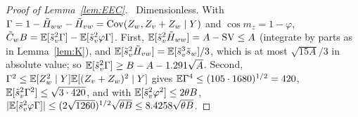 \begin{proof}[Proof of Lemma~\ref{lem:EEC}]\proofst\
Dimensionless. With $\Gamma=1-\tilde H_{ww}-\tilde H_{vw}=\operatorname{Cov}(Z_w,Z_v+Z_w\mid Y)$ and $\cos m_z=1-\varphi$, $\tilde C_wB=\mathbb{E}[\tilde s_v^2\Gamma]-\mathbb{E}[\tilde s_v^2\varphi\Gamma]$.
First, $\mathbb{E}[\tilde s_v^2\tilde H_{ww}]=A-\mathrm{SV}\le A$ (integrate by parts as in Lemma~\ref{lem:K}), and $\mathbb{E}[\tilde s_v^2\tilde H_{vw}]=\mathbb{E}[\tilde s_v^3\tilde s_w]/3$, which is at most $\sqrt{15A}/3$ in absolute value; so $\mathbb{E}[\tilde s_v^2\Gamma]\ge B-A-1.291\sqrt A$.
Second, $\Gamma^2\le\mathbb{E}[Z_w^2\mid Y]\mathbb{E}[(Z_v+Z_w)^2\mid Y]$ gives $\mathbb{E}\Gamma^4\le(105\cdot1680)^{1/2}=420$, $\mathbb{E}[\tilde s_v^2\Gamma^2]\le\sqrt{3\cdot420}$, and with $\mathbb{E}[\tilde s_v^2\varphi^2]\le2\theta B$, $|\mathbb{E}[\tilde s_v^2\varphi\Gamma]|\le(2\sqrt{1260})^{1/2}\sqrt{\theta B}\le8.4258\sqrt{\theta B}$.
\end{proof}
